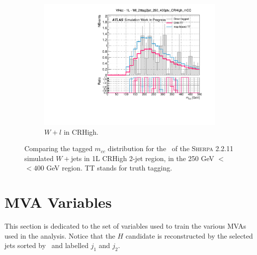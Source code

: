 \begin{figure}[h!]
\begin{subfigure}[b]{0.32\textwidth}
    \includegraphics[width=\textwidth]{Images/VH/Tagging/Wl_2tttag2jet_250_400ptv_CRHigh_mCC.pdf}
    \caption{$W+l$ in CRHigh.}
  \end{subfigure}
  \caption{Comparing the tagged $m_{cc}$ distribution for the \vhc\ of the \textsc{Sherpa} 2.2.11 simulated $W+$jets in 1L CRHigh 2-jet region, in the 250 GeV $<$ \ptv\ $< 400$ GeV region. TT stands for truth tagging.}
  \label{fig:truthtaggingW1LVHcc}
\end{figure} 

\clearpage
\section{MVA Variables}\label{ap-MVA}
This section is dedicated to the set of variables used to train the various MVAs used in the analysis. Notice that the $H$ candidate is reconstructed by the selected jets sorted by \pt\ and labelled $j_1$ and $j_2$.

